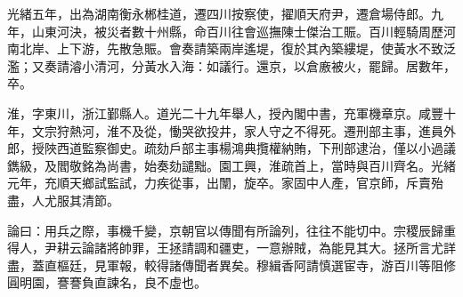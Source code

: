 \begin{pinyinscope}
光緒五年，出為湖南衡永郴桂道，遷四川按察使，擢順天府尹，遷倉場侍郎。九年，山東河決，被災者數十州縣，命百川往會巡撫陳士傑治工賑。百川輕騎周歷河南北岸、上下游，先散急賑。會奏請築兩岸遙堤，復於其內築縷堤，使黃水不致泛濫；又奏請濬小清河，分黃水入海：如議行。還京，以倉廒被火，罷歸。居數年，卒。

淮，字東川，浙江鄞縣人。道光二十九年舉人，授內閣中書，充軍機章京。咸豐十年，文宗狩熱河，淮不及從，慟哭欲投井，家人守之不得死。遷刑部主事，進員外郎，授陜西道監察御史。疏劾戶部主事楊鴻典攬權納賄，下刑部逮治，僅以小過議鐫級，及閻敬銘為尚書，始奏劾譴黜。園工興，淮疏首上，當時與百川齊名。光緒元年，充順天鄉試監試，力疾從事，出闈，旋卒。家固中人產，官京師，斥賣殆盡，人尤服其清節。

論曰：用兵之際，事機千變，京朝官以傳聞有所論列，往往不能切中。宗稷辰歸重得人，尹耕云論諸將帥罪，王拯請調和疆吏，一意辦賊，為能見其大。拯所言尤詳盡，蓋直樞廷，見軍報，較得諸傳聞者異矣。穆緝香阿請慎選宦寺，游百川等阻修圓明園，謇謇負直諫名，良不虛也。


\end{pinyinscope}